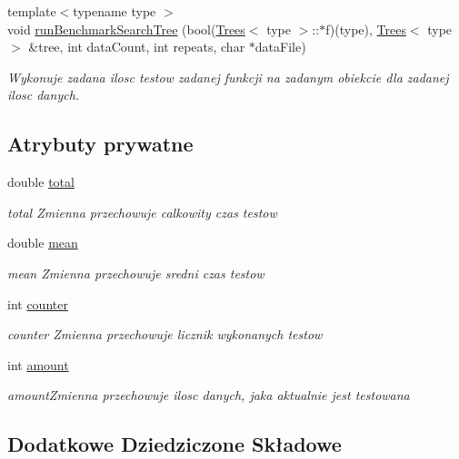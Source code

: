 \begin{DoxyCompactItemize}
{\footnotesize template$<$typename type $>$ }\\void \hyperlink{class_benchmark_a9e6b5ef8df351452be5fa0c8d127367a}{run\-Benchmark\-Search\-Tree} (bool(\hyperlink{class_trees}{Trees}$<$ type $>$\-::$\ast$f)(type), \hyperlink{class_trees}{Trees}$<$ type $>$ \&tree, int data\-Count, int repeats, char $\ast$data\-File)
\begin{DoxyCompactList}\small\item\em Wykonuje zadana ilosc testow zadanej funkcji na zadanym obiekcie dla zadanej ilosc danych. \end{DoxyCompactList}\end{DoxyCompactItemize}
\subsection*{Atrybuty prywatne}
\begin{DoxyCompactItemize}
\item 
double \hyperlink{class_benchmark_a7130c0718e3a3ab2fea70285dab122a2}{total}
\begin{DoxyCompactList}\small\item\em total Zmienna przechowuje calkowity czas testow \end{DoxyCompactList}\item 
double \hyperlink{class_benchmark_aa88092b6164ad7d1243162d3012f729a}{mean}
\begin{DoxyCompactList}\small\item\em mean Zmienna przechowuje sredni czas testow \end{DoxyCompactList}\item 
int \hyperlink{class_benchmark_a3a56c7dad0b21e490f3024d5d0027f31}{counter}
\begin{DoxyCompactList}\small\item\em counter Zmienna przechowuje licznik wykonanych testow \end{DoxyCompactList}\item 
int \hyperlink{class_benchmark_a1d0eaa6febe9b7a7f5f5147e83f60910}{amount}
\begin{DoxyCompactList}\small\item\em amount\-Zmienna przechowuje ilosc danych, jaka aktualnie jest testowana \end{DoxyCompactList}\end{DoxyCompactItemize}
\subsection*{Dodatkowe Dziedziczone Składowe}


